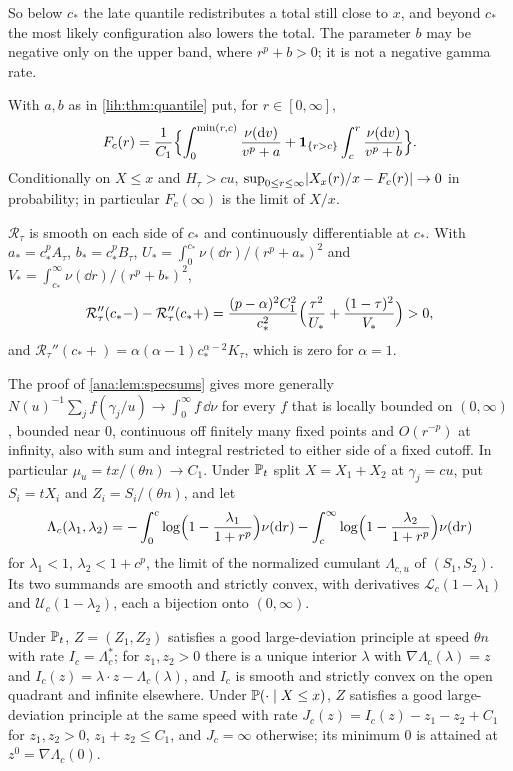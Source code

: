 So below $c_*$ the late quantile redistributes a total still close to $x$, and beyond $c_*$ the most
likely configuration also lowers the total. The parameter $b$ may be negative only on the upper band,
where $r^p+b>0$; it is not a negative gamma rate.

\begin{theorem}\label{lih:thm:quantileprofile}
With $a,b$ as in \cref{lih:thm:quantile} put, for $r\in[0,\infty]$,
\[
 F_c(r)=\frac1{C_1}\Bigl\{\int_0^{\min(r,c)}\frac{\nu(\mathrm{d} v)}{v^p+a}+\mathbf{1}_{\{r>c\}}\int_c^r\frac{\nu(\mathrm{d} v)}{v^p+b}\Bigr\}.
\]
Conditionally on $X\le x$ and $H_\tau>cu$, $\sup_{0\le r\le\infty}\lvert X_x(r)/x-F_c(r)\rvert\to0$ in probability; in particular
$F_c(\infty)$ is the limit of $X/x$.
\end{theorem}

\begin{theorem}\label{lih:thm:quantilecurv}
$\mathcal R_\tau$ is smooth on each side of $c_*$ and continuously differentiable at $c_*$. With $a_*=c_*^pA_\tau$,
$b_*=c_*^pB_\tau$, $U_*=\int_0^{c_*}\nu(\dd r)/(r^p+a_*)^2$ and $V_*=\int_{c_*}^\infty\nu(\dd r)/(r^p+b_*)^2$,
\[
 \mathcal R_\tau''(c_*-)-\mathcal R_\tau''(c_*+)=\frac{(p-\alpha)^2C_1^2}{c_*^2}\Bigl(\frac{\tau^2}{U_*}+\frac{(1-\tau)^2}{V_*}\Bigr)>0,
\]
and $\mathcal R_\tau''(c_*+)=\alpha(\alpha-1)c_*^{\alpha-2}K_\tau$, which is zero for $\alpha=1$.
\end{theorem}

The proof of \cref{ana:lem:specsums} gives more generally
$N(u)^{-1}\sum_jf(\gamma_j/u)\to\int_0^\infty f\,\dd\nu$ for every $f$ that is locally bounded on $(0,\infty)$, bounded near $0$,
continuous off finitely many fixed points and $O(r^{-p})$ at infinity, also with sum and integral
restricted to either side of a fixed cutoff. In particular $\mu_u=tx/(\theta n)\to C_1$. Under
$\mathbb{P}_t$ split $X=X_1+X_2$ at $\gamma_j=cu$, put $S_i=tX_i$ and $Z_i=S_i/(\theta n)$, and let
\[
 \Lambda_c(\lambda_1,\lambda_2)=-\int_0^c\log\Bigl(1-\frac{\lambda_1}{1+r^p}\Bigr)\nu(\mathrm{d} r)-\int_c^\infty\log\Bigl(1-\frac{\lambda_2}{1+r^p}\Bigr)\nu(\mathrm{d} r)
\]
for $\lambda_1<1$, $\lambda_2<1+c^p$, the limit of the normalized cumulant $\Lambda_{c,u}$ of $(S_1,S_2)$. Its two summands are
smooth and strictly convex, with derivatives $\mathcal L_c(1-\lambda_1)$ and $\mathcal U_c(1-\lambda_2)$, each a bijection onto $(0,\infty)$.

\begin{lemma}\label{lih:lem:twoband}
Under $\mathbb{P}_t$, $Z=(Z_1,Z_2)$ satisfies a good large-deviation principle at speed $\theta n$ with rate
$I_c=\Lambda_c^*$; for $z_1,z_2>0$ there is a unique interior $\lambda$ with $\nabla\Lambda_c(\lambda)=z$ and
$I_c(z)=\lambda\cdot z-\Lambda_c(\lambda)$, and $I_c$ is smooth and strictly convex on the open quadrant and infinite
elsewhere. Under $\mathbb{P}(\cdot\mid X\le x)$, $Z$ satisfies a good large-deviation principle at the same
speed with rate $J_c(z)=I_c(z)-z_1-z_2+C_1$ for $z_1,z_2>0$, $z_1+z_2\le C_1$, and $J_c=\infty$ otherwise; its minimum $0$
is attained at $z^0=\nabla\Lambda_c(0)$.
\end{lemma}

